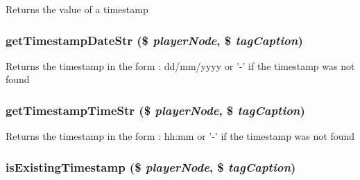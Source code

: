 Returns the value of a timestamp 
\subsubsection{\setlength{\rightskip}{0pt plus 5cm}get\-Timestamp\-Date\-Str (\$ {\em player\-Node}, \$ {\em tag\-Caption})}\label{timestamp_8php_aa6990a4d82fa2d129f072d2830c65b2}


Returns the timestamp in the form : dd/mm/yyyy or '-' if the timestamp was not found 
\subsubsection{\setlength{\rightskip}{0pt plus 5cm}get\-Timestamp\-Time\-Str (\$ {\em player\-Node}, \$ {\em tag\-Caption})}\label{timestamp_8php_5c7a1f2c1f90fda431026a376c38aea3}


Returns the timestamp in the form : hh:mm or '-' if the timestamp was not found 
\subsubsection{\setlength{\rightskip}{0pt plus 5cm}is\-Existing\-Timestamp (\$ {\em player\-Node}, \$ {\em tag\-Caption})}\label{timestamp_8php_9c483794897dcbdf2a693f2e0d8f5817}


